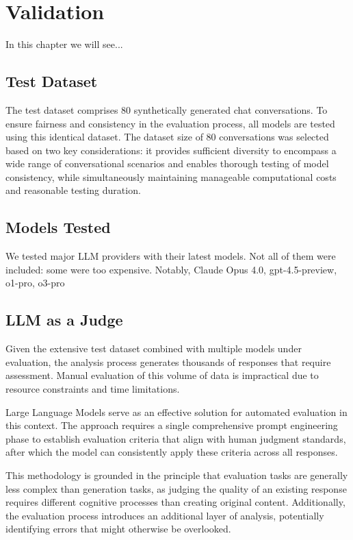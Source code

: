 \chapter{Validation}
\label{cha:validation}

In this chapter we will see...

\section{Test Dataset}

The test dataset comprises 80 synthetically generated chat conversations.
To ensure fairness and consistency in the evaluation process, all models are tested using this identical dataset.
The dataset size of 80 conversations was selected based on two key considerations: it provides sufficient diversity to encompass a wide range of conversational scenarios and enables thorough testing of model consistency, while simultaneously maintaining manageable computational costs and reasonable testing duration.

\section{Models Tested}

We tested major LLM providers with their latest models.
Not all of them were included: some were too expensive. Notably, Claude Opus 4.0, gpt-4.5-preview, o1-pro, o3-pro


\section{LLM as a Judge}

Given the extensive test dataset combined with multiple models under evaluation, the analysis process generates thousands of responses that require assessment.
Manual evaluation of this volume of data is impractical due to resource constraints and time limitations.

Large Language Models serve as an effective solution for automated evaluation in this context.
The approach requires a single comprehensive prompt engineering phase to establish evaluation criteria that align with human judgment standards, after which the model can consistently apply these criteria across all responses.

This methodology is grounded in the principle that evaluation tasks are generally less complex than generation tasks, as judging the quality of an existing response requires different cognitive processes than creating original content.
Additionally, the evaluation process introduces an additional layer of analysis, potentially identifying errors that might otherwise be overlooked.

